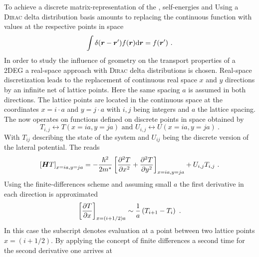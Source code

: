 To achieve a discrete matrix-representation of the \hamil{}, self-energies and
Using a \textsc{Dirac} delta distribution basis amounts to replacing the continuous function with values at the respective points in space \cite{JApplPhys.92.3730}
\begin{equation}
  \int \delta (\boldsymbol{r}-\boldsymbol{r}') f(\boldsymbol{r}) \mathrm{d}\boldsymbol{r} = f(\boldsymbol{r}')\ .
  \label{eqn:deltabasis}
\end{equation}
In order to study the influence of geometry on the transport properties of a 2DEG a real-space approach with \textsc{Dirac} delta distributions is chosen. Real-space discretization leads to the replacement of continuous real space $x$ and $y$ directions by an infinite net of lattice points. Here the same spacing $a$ is assumed in both directions. The lattice points are located in the continuous space at the coordinates $x=i\cdot a$ and $y=j\cdot a$ with $i,j$ being integers and $a$ the lattice spacing. The \hamil{} now operates on functions defined on discrete points in space obtained by
\begin{equation}
  T_{i,j} \leftrightarrow T(x=ia,y=ja) \mbox{ and } U_{i,j}\leftrightarrow U(x=ia,y=ja)\ .
  \label{FunctionDescrete}
\end{equation}
With $T_{ij}$ describing the state of the system and $U_{ij}$ being the discrete version of the lateral potential.
The \hamil{} reads
\begin{equation}
  \left[\v{H}T\right]_{x=ia,y=ja}=-\frac{\hbar^{2}}{2m^*}\left[\pdd{T}{x}+\pdd{T}{y}\right]_{x=ia,y=ja}+U_{i,j}T_{i,j}\ .
  \label{DiscreteHamil}
\end{equation}
Using the finite-differences scheme and assuming small $a$ the first derivative in each direction is approximated 
\begin{equation}
  \left[\frac{\partial T}{\partial x}\right]_{x=(i+1/2)a} \sim  \frac{1}{a}\left(T_{i+1}-T_{i}\right)\ .
  \label{ApproximateFirstDerivative}
\end{equation}
In this case the subscript denotes evaluation at a point between two lattice points $x=(i+1/2)$. By applying the concept of finite differences a second time for the second derivative one arrives at
